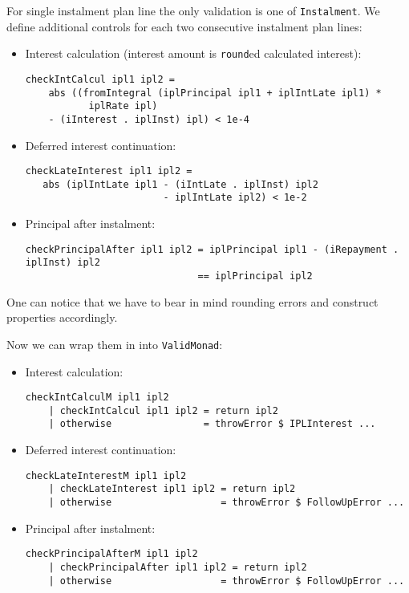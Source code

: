 \documentclass[letterpaper,11pt]{article}
\begin{document}
For single instalment plan line the only validation is one of {\tt Instalment}.
We define additional controls for each two consecutive instalment plan lines:

\begin{itemize}
\item Interest calculation (interest amount is {\tt round}ed calculated interest):
{\small
\begin{verbatim}
checkIntCalcul ipl1 ipl2 =
    abs ((fromIntegral (iplPrincipal ipl1 + iplIntLate ipl1) *
           iplRate ipl)
    - (iInterest . iplInst) ipl) < 1e-4
\end{verbatim}
}
\item Deferred interest continuation:
{\small
\begin{verbatim}
checkLateInterest ipl1 ipl2 =
   abs (iplIntLate ipl1 - (iIntLate . iplInst) ipl2
                        - iplIntLate ipl2) < 1e-2
\end{verbatim}
}
\item \label{principalCheck}Principal after instalment:
{\small
\begin{verbatim}
checkPrincipalAfter ipl1 ipl2 = iplPrincipal ipl1 - (iRepayment . iplInst) ipl2
                              == iplPrincipal ipl2
\end{verbatim}
}

\end{itemize}

One can notice that we have to bear in mind rounding errors and construct properties accordingly.


Now we can wrap them in into {\tt ValidMonad}:
\begin{itemize}
\item Interest calculation:
{\small
\begin{verbatim}
checkIntCalculM ipl1 ipl2
    | checkIntCalcul ipl1 ipl2 = return ipl2
    | otherwise                = throwError $ IPLInterest ...
\end{verbatim}
}
\item Deferred interest continuation:
{\small
\begin{verbatim}
checkLateInterestM ipl1 ipl2
    | checkLateInterest ipl1 ipl2 = return ipl2
    | otherwise                   = throwError $ FollowUpError ...
\end{verbatim}
}
\item Principal after instalment:
{\small
\begin{verbatim}
checkPrincipalAfterM ipl1 ipl2
    | checkPrincipalAfter ipl1 ipl2 = return ipl2
    | otherwise                   = throwError $ FollowUpError ...
\end{verbatim}
}
\end{itemize}
\end{document}
